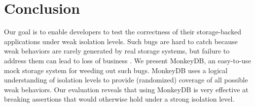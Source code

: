 
\section{Conclusion}
\label{sec:conc}

Our goal is to enable developers to test the correctness of their storage-backed applications under 
weak isolation levels. Such bugs are hard to catch because weak behaviors are
rarely generated by real storage systems, but failure to address them can lead
to loss of business \cite{DBLP:conf/sigmod/WarszawskiB17}. We present MonkeyDB, an easy-to-use mock storage system
for weeding out such bugs. MonkeyDB uses a logical understanding of isolation
levels to provide (randomized) coverage of all possible weak behaviors. Our evaluation reveals that
using MonkeyDB is very effective at breaking assertions that would otherwise
hold under a strong isolation level.

